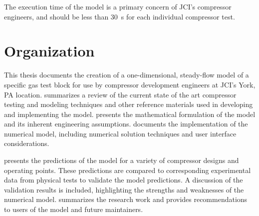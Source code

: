The execution time of the model is a primary concern of JCI's compressor engineers, 
and should be less than \SI{30}{\second} for each individual compressor test.

\section{Organization} \label{sec:organization}
This thesis documents the creation of a one-dimensional, steady-flow model 
of a specific gas test block for use by compressor development engineers at JCI's York, PA location. 
 summarizes a review of the current state of the art 
compressor testing and modeling techniques 
and other reference materials used in developing and implementing the model. 
 presents the mathematical formulation of the model 
and its inherent engineering assumptions. 
 documents the implementation of the numerical model, 
including numerical solution techniques and user interface considerations. 

 presents the predictions of the model 
for a variety of compressor designs and operating points. 
These predictions are compared to corresponding experimental data 
from physical tests to validate the model predictions.
A discussion of the validation results is included, 
highlighting the strengths and weaknesses of the numerical model.
 summarizes the research work 
and provides recommendations to users of the model and future maintainers.

\citet{flow1984}
